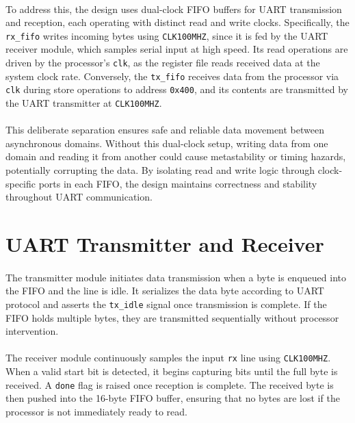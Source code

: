 \documentclass[12pt]{report}
\begin{document}
\paragraph{}
To address this, the design uses dual-clock FIFO buffers for UART transmission and reception, each operating with distinct read and write clocks. Specifically, the \texttt{rx\_fifo} writes incoming bytes using \texttt{CLK100MHZ}, since it is fed by the UART receiver module, which samples serial input at high speed. Its read operations are driven by the processor's \texttt{clk}, as the register file reads received data at the system clock rate. Conversely, the \texttt{tx\_fifo} receives data from the processor via \texttt{clk} during store operations to address \texttt{0x400}, and its contents are transmitted by the UART transmitter at \texttt{CLK100MHZ}. 

\paragraph{}
This deliberate separation ensures safe and reliable data movement between asynchronous domains. Without this dual-clock setup, writing data from one domain and reading it from another could cause metastability or timing hazards, potentially corrupting the data. By isolating read and write logic through clock-specific ports in each FIFO, the design maintains correctness and stability throughout UART communication.


\section{UART Transmitter and Receiver}

\paragraph{}
The transmitter module initiates data transmission when a byte is enqueued into the FIFO and the line is idle. It serializes the data byte according to UART protocol and asserts the \texttt{tx\_idle} signal once transmission is complete. If the FIFO holds multiple bytes, they are transmitted sequentially without processor intervention.

\paragraph{}
The receiver module continuously samples the input \texttt{rx} line using \texttt{CLK100MHZ}. When a valid start bit is detected, it begins capturing bits until the full byte is received. A \texttt{done} flag is raised once reception is complete. The received byte is then pushed into the 16-byte FIFO buffer, ensuring that no bytes are lost if the processor is not immediately ready to read.
\end{document}
